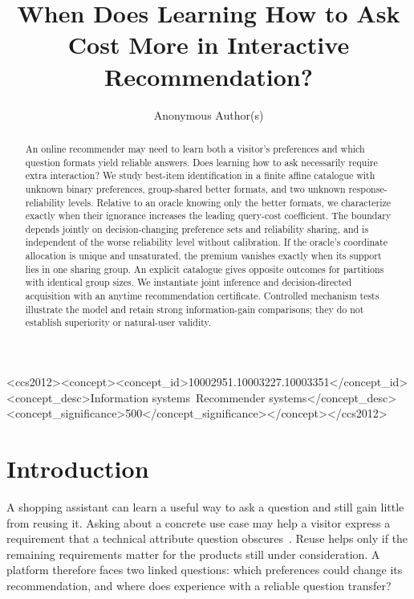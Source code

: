 \documentclass[sigconf,anonymous,review]{acmart}
\title[Learning How to Ask in Interactive Recommendation]{When Does Learning How to Ask Cost More in Interactive Recommendation?}
\author{Anonymous Author(s)}
\begin{document}
\begin{abstract}
An online recommender may need to learn both a visitor's preferences and which question formats yield reliable answers. Does learning how to ask necessarily require extra interaction? We study best-item identification in a finite affine catalogue with unknown binary preferences, group-shared better formats, and two unknown response-reliability levels. Relative to an oracle knowing only the better formats, we characterize exactly when their ignorance increases the leading query-cost coefficient. The boundary depends jointly on decision-changing preference sets and reliability sharing, and is independent of the worse reliability level without calibration. If the oracle's coordinate allocation is unique and unsaturated, the premium vanishes exactly when its support lies in one sharing group. An explicit catalogue gives opposite outcomes for partitions with identical group sizes. We instantiate joint inference and decision-directed acquisition with an anytime recommendation certificate. Controlled mechanism tests illustrate the model and retain strong information-gain comparisons; they do not establish superiority or natural-user validity.
\end{abstract}
\begin{CCSXML}
<ccs2012><concept><concept_id>10002951.10003227.10003351</concept_id><concept_desc>Information systems~Recommender systems</concept_desc><concept_significance>500</concept_significance></concept></ccs2012>
\end{CCSXML}
\maketitle

\section{Introduction}
A shopping assistant can learn a useful way to ask a question and still gain little from reusing it. Asking about a concrete use case may help a visitor express a requirement that a technical attribute question obscures~\cite{kostric2021}. Reuse helps only if the remaining requirements matter for the products still under consideration. A platform therefore faces two linked questions: which preferences could change its recommendation, and where does experience with a reliable question transfer?
\end{document}
